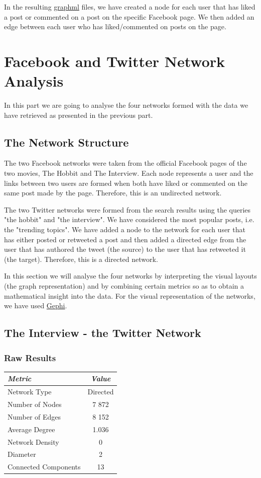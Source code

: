 \documentclass{llncs}
\begin{document}
In the resulting \href{http://graphml.graphdrawing.org/}{graphml} files, we have
created a node for each user that has liked a post or commented on a post on the
specific Facebook page. We then added an edge between each user who has
liked/commented on posts on the page.
%
\section{Facebook and Twitter Network Analysis}
In this part we are going to analyse the four networks formed with the data we
have retrieved as presented in the previous part.
%
\subsection{The Network Structure}
The two Facebook networks were taken from the official Facebook pages of the two
movies, The Hobbit and The Interview. Each node represents a user and the
links between two users are formed when both have liked or commented on the same
post made by the page. Therefore, this is an undirected network.

The two Twitter networks were formed from the search results using the queries
"the hobbit" and "the interview". We have considered the most popular posts,
i.e. the "trending topics". We have added a node to the network for each user
that has either posted or retweeted a post and then added a directed edge from
the user that has authored the tweet (the source) to the user that has retweeted
it (the target). Therefore, this is a directed network.

In this section we will analyse the four networks by interpreting the visual
layouts (the graph representation) and by combining certain metrics so as to
obtain a mathematical insight into the data. For the visual representation of
the networks, we have used \href{https://gephi.org/}{Gephi}.
%
\subsection{The Interview - the Twitter Network}
\subsubsection{Raw Results}
\begin{center}
    \begin{tabular}{ l | c }
        \hline
        \textit{Metric} & \textit{Value} \\ \hline
        Network Type & Directed \\ \hline
        Number of Nodes & 7 872 \\ \hline
        Number of Edges & 8 152 \\ \hline
        Average Degree & 1.036 \\ \hline
        Network Density & 0 \\ \hline
        Diameter & 2 \\ \hline
        Connected Components & 13 \\
        \hline
    \end{tabular}
\end{center}
%
\end{document}
